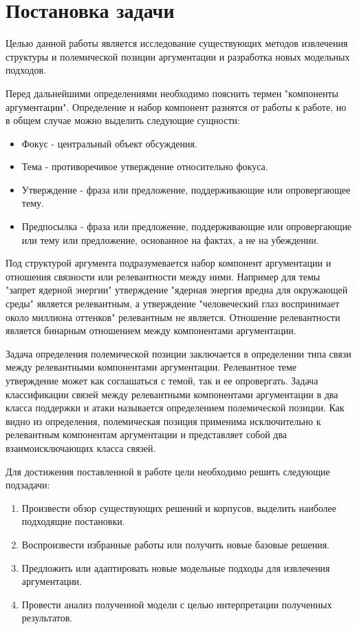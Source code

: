 \section{Постановка задачи}
Целью данной работы является исследование существующих методов извлечения структуры и полемической позиции аргументации и разработка новых модельных подходов. 

Перед дальнейшими определениями необходимо пояснить термен "компоненты аргументации". Определение и набор компонент разнятся от работы к работе, но в общем случае можно выделить следующие сущности:

\begin{itemize}
    \item Фокус - центральный объект обсуждения.
    \item Тема - противоречивое утверждение относительно фокуса.
    \item Утверждение - фраза или предложение, поддерживающие или опровергающее тему.
    \item Предпосылка - фраза или предложение, поддерживающие или опровергающие или тему или предложение, основанное на фактах, а не на убеждении.
\end{itemize}

Под структурой аргумента подразумевается набор компонент аргументации и отношения связности или релевантности между ними. Например для темы "запрет ядерной энергии" утверждение "ядерная энергия вредна для окружающей среды" является релевантным, а утверждение "человеческий глаз воспринимает около миллиона оттенков" релевантным не является. Отношение релевантности является бинарным отношением между компонентами аргументации.

Задача определения полемической позиции заключается в определении типа связи между релевантными компонентами аргументации. Релевантное теме утверждение может как соглашаться с темой, так и ее опровергать. Задача классификации связей между релевантными компонентами аргументации в два класса поддержки и атаки называется определением полемической позиции. Как видно из определения, полемическая позиция применима исключительно к релевантным компонентам аргументации и представляет собой два взаимоисключающих класса связей.

Для достижения поставленной в работе цели необходимо решить следующие подзадачи:

\begin{enumerate}
	\item Произвести обзор существующих решений и корпусов, выделить наиболее подходящие постановки.
    \item Воспроизвести избранные работы или получить новые базовые решения.
    \item Предложить или адаптировать новые модельные подходы для извлечения аргументации.
    \item Провести анализ полученной модели с целью интерпретации полученных результатов.
\end{enumerate}
